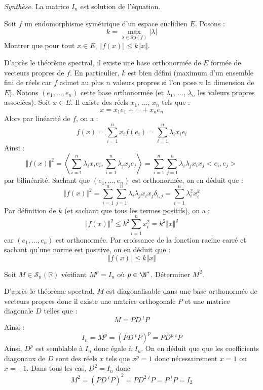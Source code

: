 \documentclass[a4paper,10pt]{report}
\begin{document}
\medskip

\noindent \textit{Synthèse.} La matrice $I_n$ est solution de l'équation.


\begin{Exercice}{} Soit $f$ un endomorphisme symétrique d'un espace euclidien $E$. Posons :
  \[
  k = \max_{\lambda \in \textrm{Sp}(f)} \vert \lambda \vert
  \]
Montrer que pour tout $x \in E$, $\Vert f(x) \Vert \leq k \Vert x \Vert$.
\end{Exercice}

\corr D'après le théorème spectral, il existe une base orthonormée de $E$ formée de vecteurs propres de $f$. En particulier, $k$ est bien défini (maximum d'un ensemble fini de réels car $f$ admet au plus $n$ valeurs propres si l'on pose $n$ la dimension de $E$). Notons $(e_1, \ldots, e_n)$ cette base orthonormée (et $\lambda_1$, $\ldots$, $\lambda_n$ les valeurs propres associées). Soit $x \in E$. Il existe des réels $x_1$, $\ldots$, $x_n$ tels que :
$$ x=  x_1 e_1 + \cdots +  x_n e_n$$ 
Alors par linéarité de $f$, on a :
$$ f(x) = \sum_{i=1}^n x_i f(e_i) = \sum_{i=1}^n \lambda_i x_i e_i$$
Ainsi :
$$ \Vert f(x) \Vert^2 = \left<\sum_{i=1}^n \lambda_i x_i e_i, \sum_{i=1}^n \lambda_j x_j e_j \right> = \sum_{i=1}^n \sum_{j=1}^n \lambda_i \lambda_j x_i x_j <e_i, e_j>$$
par bilinéarité. Sachant que $(e_1, \ldots, e_n)$ est orthonormée, on en déduit que :
$$ \Vert f(x) \Vert^2 = \sum_{i=1}^n \sum_{j=1}^n \lambda_i \lambda_j x_i x_j \delta_{i,j} = \sum_{i=1}^n \lambda_i^2 x_i^2 $$
Par définition de $k$ (et sachant que tous les termes positifs), on a :
$$  \Vert f(x) \Vert^2 \leq  k^2 \sum_{i=1}^n  x_i^2 = k^2 \Vert x\Vert^2$$
car $(e_1, \ldots, e_n)$ est orthonormée. Par croissance de la fonction racine carré et sachant qu'une norme est positive, on en déduit que :
$$ \Vert f(x) \Vert \leq k \Vert x \Vert$$


\begin{Exercice}{} Soit $M \in  \mathcal{S}_{n}(\mathbb{R})$ vérifiant $M^{p}= I_{n}$ où $p \in \N^{*}$. Déterminer $M^2$.
\end{Exercice}

\corr D'après le théorème spectral, $M$ est diagonalisable dans une base orthonormée de vecteurs propres donc il existe une matrice orthogonale $P$ et une matrice diagonale $D$ telles que :
$$ M = PD ~^tP$$
Ainsi :
$$ I_n= M^p = (PD ~^tP)^p = PD^p ~^tP$$
Ainsi, $D^p$ est semblable à $I_n$ donc égale à $I_n$. On en déduit que que les coefficients diagonaux  de $D$ sont des réels $x$ tels que $x^p=1$ donc nécessairement $x=1$ ou $x=-1$. Dans tous les cas, $D^2=I_n$ donc
$$ M^2= (PD ~^tP)^2 = PD^2 ~^tP = P~^tP= I_2$$
\end{document}
